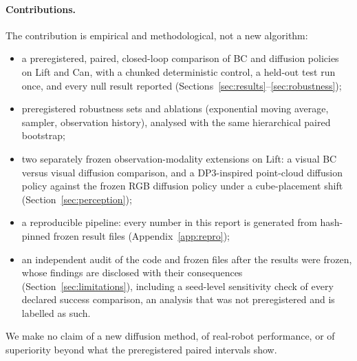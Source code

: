 \paragraph{Contributions.} The contribution is empirical and methodological, not a new
algorithm:
\begin{itemize}
\item a preregistered, paired, closed-loop comparison of BC and diffusion policies on Lift
  and Can, with a chunked deterministic control, a held-out test run once, and every
  null result reported (Sections~\ref{sec:results}--\ref{sec:robustness});
\item preregistered robustness sets and ablations (exponential moving average, sampler,
  observation history), analysed with the same hierarchical paired bootstrap;
\item two separately frozen observation-modality extensions on Lift: a visual BC versus
  visual diffusion comparison, and a DP3-inspired point-cloud diffusion policy against
  the frozen RGB diffusion policy under a cube-placement shift
  (Section~\ref{sec:perception});
\item a reproducible pipeline: every number in this report is generated from hash-pinned
  frozen result files (Appendix~\ref{app:repro});
\item an independent audit of the code and frozen files after the results were frozen,
  whose findings are disclosed with their consequences (Section~\ref{sec:limitations}),
  including a seed-level sensitivity check of every declared success comparison, an analysis
  that was not preregistered and is labelled as such.
\end{itemize}
We make no claim of a new diffusion method, of real-robot performance, or of superiority
beyond what the preregistered paired intervals show.
